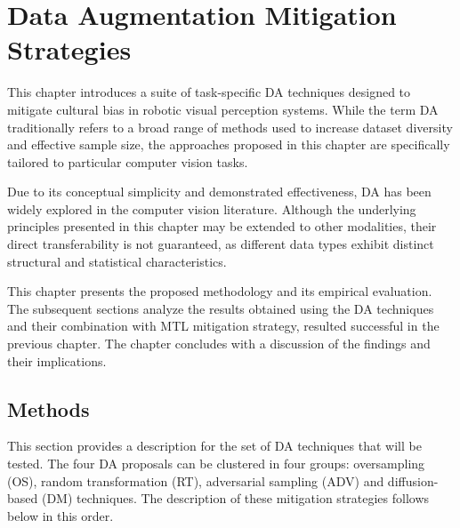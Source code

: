 \chapter{Data Augmentation Mitigation Strategies}
\label{ch3}
\ifpdf
    \graphicspath{{Chapter3/Figs/Raster/}{Chapter3/Figs/PDF/}{Chapter3/Figs/}}
\else
    \graphicspath{{Chapter3/Figs/Vector/}{Chapter3/Figs/}}
\fi
%

%
This chapter introduces a suite of task-specific DA techniques designed to mitigate cultural bias in robotic visual perception systems. While the term DA traditionally refers to a broad range of methods used to increase dataset diversity and effective sample size, the approaches proposed in this chapter are specifically tailored to particular computer vision tasks.

Due to its conceptual simplicity and demonstrated effectiveness, DA has been widely explored in the computer vision literature. Although the underlying principles presented in this chapter may be extended to other modalities, their direct transferability is not guaranteed, as different data types exhibit distinct structural and statistical characteristics.

This chapter presents the proposed methodology and its empirical evaluation. 
The subsequent sections analyze the results obtained using the DA techniques and their combination with MTL mitigation strategy, resulted successful in the previous chapter. 
The chapter concludes with a discussion of the findings and their implications.


\section{Methods}
This section provides a description for the set of DA techniques that will be tested.
The four DA proposals can be clustered in four groups: oversampling (OS), random transformation (RT), adversarial sampling (ADV) and diffusion-based (DM) techniques.
The description of these mitigation strategies follows below in this order.


